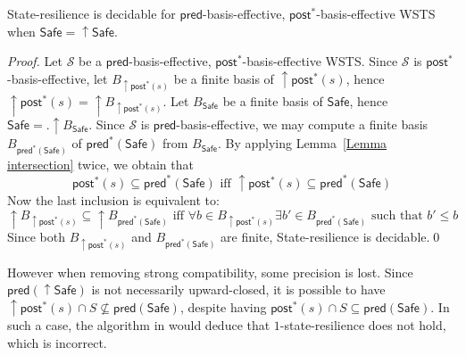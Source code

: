\documentclass[runningheads]{llncs}
\newcommand{\alain}[1]{\todo[inline,color=red!20]{{\bf AF:} #1}}
\newcommand{\pred}{\textsf{pred}}
\newcommand{\post}{\textsf{post}}
\newcommand{\Safe}{\textsf{Safe}}
\begin{document}
\begin{theorem}\label{post srp}
{\sc State-resilience} is decidable for $\pred$-basis-effective, $\post^*$-basis-effective WSTS
when
$\Safe=\mathop{\uparrow} \Safe$. 
\end{theorem}


\begin{proof}
Let $\mathscr{S}$ be a $\pred$-basis-effective, $\post^*$-basis-effective WSTS.
%
Since $\mathscr{S}$ is $\post^*$-basis-effective, let $B_{\mathop{\uparrow} \post^*(s)}$ 
 be a finite basis of $\mathop{\uparrow} \post^*(s)$, hence $\mathop{\uparrow} \post^*(s) = \mathop{\uparrow} B_{\mathop{\uparrow} \post^*(s)}$.
%
Let $B_\Safe$ be a finite basis of $\Safe$, hence $\Safe = .\mathop{\uparrow} B_\Safe$.
%
Since $\mathscr{S}$ is $\pred$-basis-effective, we may compute a finite basis $B_{\pred^*(\Safe)}$ of $\pred^*(\Safe)$ from $B_\Safe$.
%
%
By applying Lemma~\ref{Lemma intersection} twice,
we obtain that 
\[ \post^*(s) 
 \subseteq \pred^*(\Safe) \text{ iff } \mathop{\uparrow} \post^*(s)
 \subseteq \pred^*(\Safe)\]
%
%
%
Now the last inclusion is equivalent to:
\[ \mathop{\uparrow} B_{\mathop{\uparrow} \post^*(s)} 
 \subseteq \mathop{\uparrow}  B_{\pred^*(\Safe)} \text{ iff } \forall b \in B_{\mathop{\uparrow} \post^*(s)}  \exists b' \in B_{\pred^*(\Safe)} \text{ such that } b' \leq b \]
%
Since both $B_{\mathop{\uparrow} \post^*(s)}$ and $B_{\pred^*(\Safe)}$ are finite, {\sc State-resilience} is decidable.\qed
%
%
\end{proof}





However when removing strong compatibility, some precision is lost.
Since $\pred(\mathop{\uparrow} \Safe)$ is not necessarily upward-closed, it is possible to have 
 $\mathop{\uparrow} \post^* (s) \cap S \not\subseteq \pred(\Safe)$,
despite having 
$\post^* (s) \cap S \subseteq \pred( \Safe)$.
In such a case, the algorithm in
\cite{DBLP:conf/gg/Ozkan22} would deduce that {\sc $1$-state-resilience} does not hold,
which is incorrect.
\end{document}
